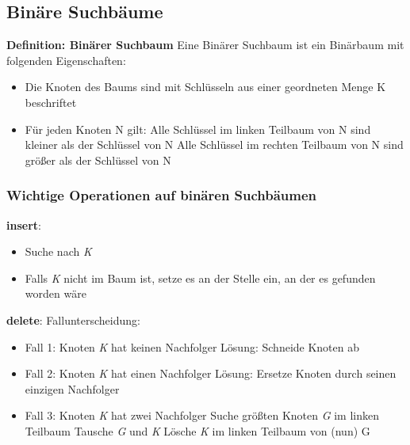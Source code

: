\documentclass[12pt]{article}
\begin{document}
\newpage
\subsection{Binäre Suchbäume}

\textbf{Definition: Binärer Suchbaum} \newline
Eine Binärer Suchbaum ist ein Binärbaum mit folgenden Eigenschaften:
\begin{itemize}
	\item Die Knoten des Baums sind mit Schlüsseln aus einer geordneten Menge K beschriftet
	\item Für jeden Knoten N gilt:
	\subitem \small{Alle Schlüssel im linken Teilbaum von N sind kleiner als der Schlüssel von N}
	\subitem \small{Alle Schlüssel im rechten Teilbaum von N sind größer als der Schlüssel von N}
\end{itemize}

\subsubsection{Wichtige Operationen auf binären Suchbäumen}

\textbf{insert}:
\begin{itemize}
	\item Suche nach \textit{K}
	\item Falls \textit{K} nicht im Baum ist, setze es an der Stelle ein, an der es gefunden worden wäre
\end{itemize}


\textbf{delete}:
Fallunterscheidung:
\begin{itemize}
	\item Fall 1: Knoten \textit{K} hat keinen Nachfolger
	\subitem Lösung: Schneide Knoten ab
	\item Fall 2: Knoten \textit{K} hat einen Nachfolger
	\subitem Lösung: Ersetze Knoten durch seinen einzigen Nachfolger
	\item Fall 3: Knoten \textit{K} hat zwei Nachfolger
	\subitem Suche größten Knoten \textit{G} im linken Teilbaum
	\subitem Tausche \textit{G} und \textit{K}
	\subitem Lösche \textit{K} im linken Teilbaum von (nun) G
\end{itemize}
\end{document}
